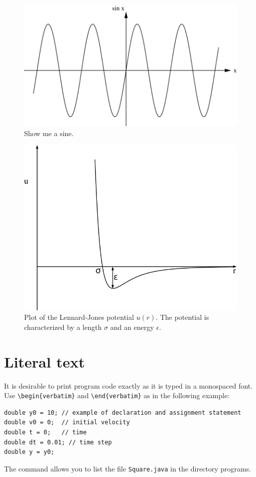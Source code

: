 \documentclass[12pt]{article}
\begin{document}
\begin{figure}
\centering
\includegraphics{figures/sine}
\caption{Show me a sine.}
\label{fig:typical}
\end{figure}

\begin{figure}
\centering
\includegraphics[scale=0.6]{figures/lj}
\caption{Plot of the Lennard-Jones potential $u(r)$. The potential is characterized by a length $\sigma$ and an energy $\epsilon$.}
\label{fig:lj}
\end{figure}

\section{Literal text}
It is desirable to print program code exactly as it is typed in a monospaced font. Use \verb+\begin{verbatim}+ and \verb+\end{verbatim}+ as in the following example:
\begin{verbatim}
double y0 = 10; // example of declaration and assignment statement
double v0 = 0;  // initial velocity
double t = 0;   // time
double dt = 0.01; // time step
double y = y0;
\end{verbatim}
The command \verb++ allows you to list the file \texttt{Square.java} in the directory programs.
\end{document}
